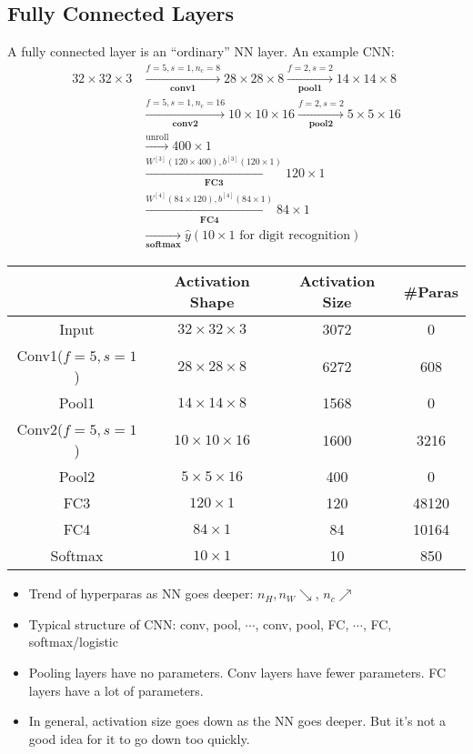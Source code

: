\subsection{Fully Connected Layers}
A fully connected layer is an ``ordinary'' NN layer. An example CNN:
\begin{align*}
  32\times 32\times 3&\xrightarrow[\textbf{conv1}]{f=5,s=1,n_c=8}28\times 28\times 8\xrightarrow[\textbf{pool1}]{f=2,s=2}14\times 14\times 8\\
  &\xrightarrow[\textbf{conv2}]{f=5,s=1,n_c=16}10\times 10\times 16\xrightarrow[\textbf{pool2}]{f=2,s=2}5\times 5\times 16\\
  &\xrightarrow{\text{unroll}}400\times 1\\
  &\xrightarrow[\textbf{FC3}]{W^{[3]}(120\times 400), b^{[3]}(120\times 1)}120\times 1\\
  &\xrightarrow[\textbf{FC4}]{W^{[4]}(84\times 120), b^{[4]}(84\times 1)}84\times 1\\
  &\xrightarrow[\textbf{softmax}]{}\hat{y}(10\times 1\text{ for digit recognition})
\end{align*}
\begin{table}[ht]
  \centering
  \begin{tabular}{c|ccc}
    & Activation Shape      & Activation Size & \#Paras\\\hline
    Input   & $32\times 32\times 3$ & 3072 & 0\\
    Conv1($f=5,s=1$)   & $28\times 28\times 8$ & 6272 & 608\\
    Pool1   & $14\times 14\times 8$ & 1568 & 0\\
    Conv2($f=5,s=1$)   & $10\times 10\times 16$ & 1600 & 3216\\
    Pool2   & $5\times 5\times 16$ & 400 & 0\\
    FC3     & $120\times 1$ & 120 & 48120\\
    FC4     & $84\times 1$ & 84 & 10164\\
    Softmax & $10\times 1$ & 10 & 850\\
  \end{tabular}
\end{table}
\begin{itemize}
  \item Trend of hyperparas as NN goes deeper: $n_H,n_W\searrow$, $n_c\nearrow$
  \item Typical structure of CNN: conv, pool, $\cdots$, conv, pool, FC, $\cdots$, FC, softmax/logistic
  \item Pooling layers have no parameters. Conv layers have fewer parameters. FC layers have a lot of parameters.
  \item In general, activation size goes down as the NN goes deeper. But it's not a good idea for it to go down too quickly.
\end{itemize}
